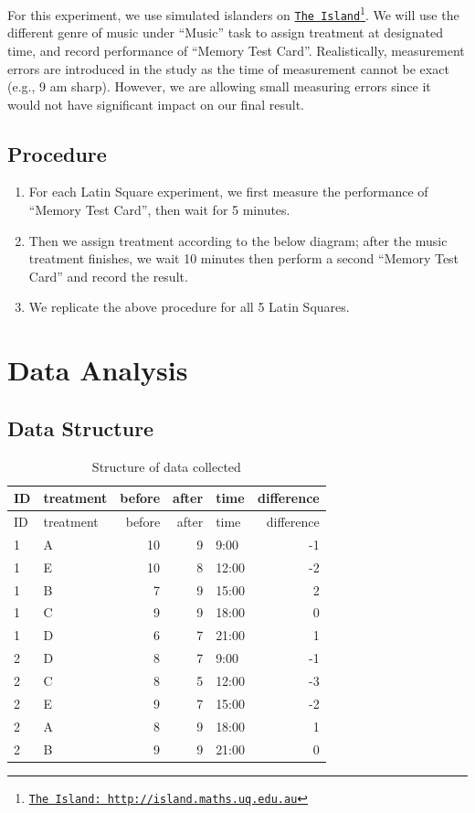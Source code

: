 \documentclass[]{article}
\providecommand{\tightlist}{%
  \setlength{\itemsep}{0pt}\setlength{\parskip}{0pt}}
\let\rmarkdownfootnote\footnote%
\def\footnote{\protect\rmarkdownfootnote}
\begin{document}
For this experiment, we use simulated islanders on
\href{http://island.maths.uq.edu.au/index.php}{\texttt{The\ Island}}\footnote{\href{http://island.maths.uq.edu.au}{\texttt{The\ Island:\ http://island.maths.uq.edu.au}}}.
We will use the different genre of music under ``Music'' task to assign
treatment at designated time, and record performance of ``Memory Test
Card''. Realistically, measurement errors are introduced in the study as
the time of measurement cannot be exact (e.g., 9 am sharp). However, we
are allowing small measuring errors since it would not have significant
impact on our final result.

\subsection{Procedure}\label{procedure}

\begin{enumerate}
\def\labelenumi{(\arabic{enumi})}
\tightlist
\item
  For each Latin Square experiment, we first measure the performance of
  ``Memory Test Card'', then wait for 5 minutes.
\item
  Then we assign treatment according to the below diagram; after the
  music treatment finishes, we wait 10 minutes then perform a second
  ``Memory Test Card'' and record the result.
\item
  We replicate the above procedure for all 5 Latin Squares.
\end{enumerate}

\section{Data Analysis}\label{data-analysis}

\subsection{Data Structure}\label{data-structure}

\begin{longtable}[]{@{}llrrlr@{}}
\caption{Structure of data collected}\tabularnewline
\toprule
ID & treatment & before & after & time & difference\tabularnewline
\midrule
\endfirsthead
\toprule
ID & treatment & before & after & time & difference\tabularnewline
\midrule
\endhead
1 & A & 10 & 9 & 9:00 & -1\tabularnewline
1 & E & 10 & 8 & 12:00 & -2\tabularnewline
1 & B & 7 & 9 & 15:00 & 2\tabularnewline
1 & C & 9 & 9 & 18:00 & 0\tabularnewline
1 & D & 6 & 7 & 21:00 & 1\tabularnewline
2 & D & 8 & 7 & 9:00 & -1\tabularnewline
2 & C & 8 & 5 & 12:00 & -3\tabularnewline
2 & E & 9 & 7 & 15:00 & -2\tabularnewline
2 & A & 8 & 9 & 18:00 & 1\tabularnewline
2 & B & 9 & 9 & 21:00 & 0\tabularnewline
\bottomrule
\end{longtable}
\end{document}
